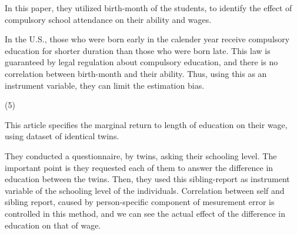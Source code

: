 \documentclass[dvipdfmx]{jsarticle}
\begin{document}
\begin{enumerate}
 In this paper, they utilized birth-month of the students, to identify the effect of compulsory school attendance on their ability and wages.
 
 In the U.S., those who were born early in the calender year receive compulsory education for shorter duration than those who were born late. This law is guaranteed by legal regulation about compulsory education, and there is no correlation between birth-month and their ability. Thus, using this as an instrument variable, they can limit the estimation bias.
 
 (5)
 
This article specifies the marginal return to length of education on their wage, using dataset of identical twins.

They conducted a questionnaire, by twins, asking their schooling level. The important point is they requested each of them to answer the difference in education between the twins. Then, they used this sibling-report as instrument variable of the schooling level of the individuals. Correlation between self and sibling report, caused by person-specific component of mesurement error is controlled in this method, and we can see the actual effect of the difference in education on that of wage.
 
 \end{enumerate}
\end{document}
